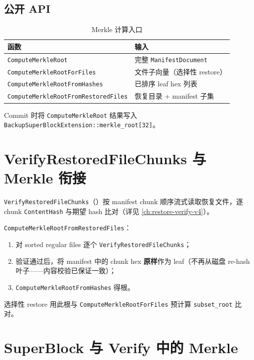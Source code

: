 \subsection{公开 API}

\begin{table}[htbp]
\centering
\caption{Merkle 计算入口}
\small
\begin{tabular}{@{}ll@{}}
\toprule
函数 & 输入 \\
\midrule
\texttt{ComputeMerkleRoot} & 完整 \texttt{ManifestDocument} \\
\texttt{ComputeMerkleRootForFiles} & 文件子向量（选择性 restore） \\
\texttt{ComputeMerkleRootFromHashes} & 已排序 leaf hex 列表 \\
\texttt{ComputeMerkleRootFromRestoredFiles} & 恢复目录 + manifest 子集 \\
\bottomrule
\end{tabular}
\end{table}

Commit 时将 \texttt{ComputeMerkleRoot} 结果写入 \texttt{BackupSuperBlockExtension::merkle\_root[32]}。

\section{VerifyRestoredFileChunks 与 Merkle 衔接}

\texttt{VerifyRestoredFileChunks}（）按 manifest chunk 顺序流式读取恢复文件，逐 chunk \texttt{ContentHash} 与期望 hash 比对（详见 \cref{ch:restore-verify-v4}）。

\texttt{ComputeMerkleRootFromRestoredFiles}：
\begin{enumerate}
  \item 对 sorted regular files 逐个 \texttt{VerifyRestoredFileChunks}；
  \item 验证通过后，将 manifest 中的 chunk hex \textbf{原样}作为 leaf（不再从磁盘 re-hash 叶子——内容校验已保证一致）；
  \item \texttt{ComputeMerkleRootFromHashes} 得根。
\end{enumerate}

选择性 restore 用此根与 \texttt{ComputeMerkleRootForFiles} 预计算 \texttt{subset\_root} 比对。

\section{SuperBlock 与 Verify 中的 Merkle}


